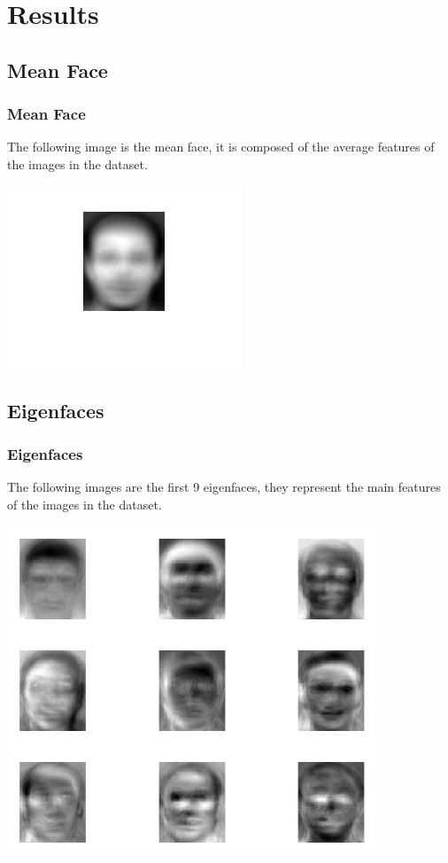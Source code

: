 \documentclass[10pt]{beamer}
\begin{document}
\section{Results}

\subsection{Mean Face}
\begin{frame}
    \frametitle{Mean Face}
    The following image is the mean face, it is composed of the average features of the images in the dataset.

    \begin{center}
        \includegraphics{mean_face}    
    \end{center}
    
\end{frame}

\subsection{Eigenfaces}
\begin{frame}
    \frametitle{Eigenfaces}
    The following images are the first 9 eigenfaces, they represent the main features of the images in the dataset.

    \begin{center}
        \includegraphics[scale=0.7]{first_9_eigenfaces}    
    \end{center}
    
\end{frame}
\end{document}
